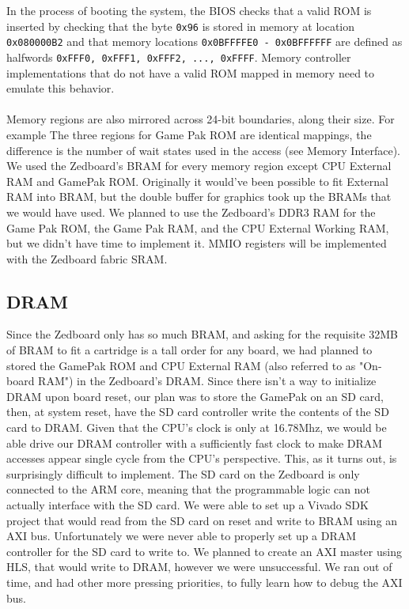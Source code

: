 \documentclass[11pt,a4paper]{article}
\begin{document}
	In the process of booting the system, the BIOS checks that a valid ROM is inserted by checking that the byte \texttt{0x96} is stored in memory at location \texttt{0x080000B2} and that memory locations \texttt{0x0BFFFFE0 - 0x0BFFFFFF} are defined as halfwords \texttt{0xFFF0, 0xFFF1, 0xFFF2, ..., 0xFFFF}. Memory controller implementations that do not have a valid ROM mapped in memory need to emulate this behavior.\\\\
	Memory regions are also mirrored across 24-bit boundaries, along their size. For example
	The three regions for Game Pak ROM are identical mappings, the difference is the number of wait states used in the access (see Memory Interface). We used the Zedboard's BRAM for every memory region except CPU External RAM and GamePak ROM. Originally it would've been possible to fit External RAM into BRAM, but the double buffer for graphics took up the BRAMs that we would have used. We planned to use the Zedboard's DDR3 RAM for the Game Pak ROM, the Game Pak RAM, and the CPU External Working RAM, but we didn't have time to implement it. MMIO registers will be implemented with the Zedboard fabric SRAM.
	
	\subsection{DRAM}
	Since the Zedboard only has so much BRAM, and asking for the requisite 32MB of BRAM to fit a cartridge is a tall order for any board, we had planned to stored the GamePak ROM and CPU External RAM (also referred to as "On-board RAM") in the Zedboard's DRAM. Since there isn't a way to initialize DRAM upon board reset, our plan was to store the GamePak on an SD card, then, at system reset, have the SD card controller write the contents of the SD card to DRAM. Given that the CPU's clock is only at 16.78Mhz, we would be able drive our DRAM controller with a sufficiently fast clock to make DRAM accesses appear single cycle from the CPU's perspective. This, as it turns out, is surprisingly difficult to implement. The SD card on the Zedboard is only connected to the ARM core, meaning that the programmable logic can not actually interface with the SD card.  We were able to set up a Vivado SDK project that would read from the SD card on reset and write to BRAM using an AXI bus.  Unfortunately we were never able to properly set up a DRAM controller for the SD card to write to.  We planned to create an AXI master using HLS, that would write to DRAM, however we were unsuccessful.  We ran out of time, and had other more pressing priorities, to fully learn how to debug the AXI bus.
	 
\end{document}
